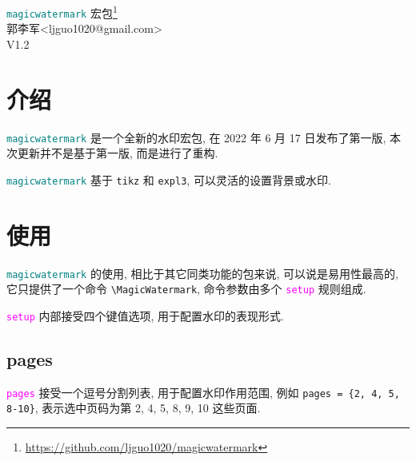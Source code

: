 \documentclass{article}
\def\pkgname{\textcolor{teal}{\texttt{magicwatermark}}}
\newcounter{example}
\def\opt#1{\textcolor{magenta}{\texttt{#1}}}
\begin{document}
\vspace*{\fill}
\begin{center}
  {\Huge \textcolor{teal}{\texttt{magicwatermark}} 宏包\footnote{\url{https://github.com/ljguo1020/magicwatermark}}} \\[.5cm]
  {\Large 郭李军<ljguo1020@gmail.com>} \\[.5cm]
  {\Large V1.2}\\[1cm]
\begin{example}[]
\end{example}
\end{center}

\vspace*{\fill}

\newpage


\linespread{1.3}\selectfont
\tableofcontents

\section{介绍}

\pkgname{} 是一个全新的水印宏包, 在 2022 年 6 月 17 日发布了第一版, 本次更新并不是基于第一版, 而是进行了重构.

\pkgname{} 基于 \texttt{tikz} 和 \texttt{expl3}, 可以灵活的设置背景或水印.

\section{使用}
\pkgname{} 的使用, 相比于其它同类功能的包来说, 可以说是易用性最高的, 它只提供了一个命令 \verb|\MagicWatermark|, 命令参数由多个 \opt{setup} 规则组成.
\begin{example}[]
\end{example}

\opt{setup} 内部接受四个键值选项, 用于配置水印的表现形式.

\subsection{pages}
\opt{pages} 接受一个逗号分割列表, 用于配置水印作用范围, 例如 \verb|pages = {2, 4, 5, 8-10}|, 表示选中页码为第 2, 4, 5, 8, 9, 10 这些页面.
\end{document}
